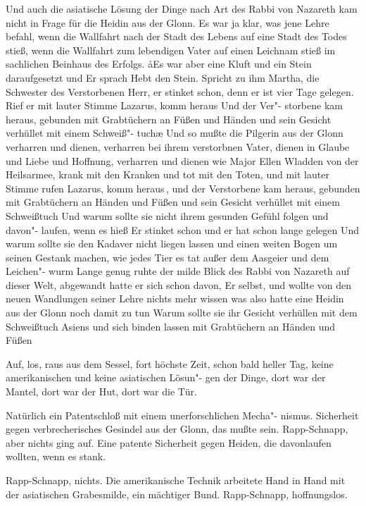 Und auch die asiatische Lösung der Dinge nach Art des Rabbi
von Nazareth kam nicht in Frage für die Heidin aus der Glonn.
Es war ja klar, was jene Lehre befahl, wenn die Wallfahrt nach
der Stadt des Lebens auf eine Stadt des Todes stieß, wenn
die Wallfahrt zum lebendigen Vater auf einen Leichnam stieß
im sachlichen Beinhaus des Erfolgs. \aa{}Es war aber eine Kluft
und ein Stein daraufgesetzt und Er sprach\dopp{} Hebt den Stein.
Spricht zu ihm Martha, die Schwester des Verstorbenen\dopp{}
Herr, er stinket schon, denn er ist vier Tage gelegen. Rief er
mit lauter Stimme\dopp{} Lazarus, komm heraus\ausr{} Und der Ver"-%
storbene kam heraus, gebunden mit Grabtüchern an Füßen
und Händen und sein Gesicht verhüllet mit einem Schweiß"-%
tuch\ausr{}\ae{} Und so mußte die Pilgerin aus der Glonn verharren
und dienen, verharren bei ihrem verstorbnen Vater, dienen
in Glaube und Liebe und Hoffnung, verharren und dienen
wie Major Ellen Wladden von der Heilsarmee, krank mit den
Kranken und tot mit den Toten, und mit lauter Stimme rufen\dopp{}
Lazarus, komm heraus\ausr{}\,, und der Verstorbene kam heraus,
gebunden mit Grabtüchern an Händen und Füßen und sein
Gesicht verhüllet mit einem Schweißtuch\punkte{} Und warum
sollte sie nicht ihrem gesunden Gefühl folgen und davon"-%
laufen, wenn es hieß\dopp{} Er stinket schon und er hat schon lange
gelegen\frag{} Und warum sollte sie den Kadaver nicht liegen
lassen und einen weiten Bogen um seinen Gestank machen,
wie jedes Tier es tat außer dem Aasgeier und dem Leichen"-%
wurm\frag{} Lange genug ruhte der milde Blick des Rabbi von
Nazareth auf dieser Welt, abgewandt hatte er sich schon
davon, Er selbst, und wollte von den neuen Wandlungen
seiner Lehre nichts mehr wissen\dopp{} was also hatte eine
Heidin aus der Glonn noch damit zu tun\frag{} Warum sollte
sie ihr Gesicht verhüllen mit dem Schweißtuch Asiens
und sich binden lassen mit Grabtüchern an Händen und
Füßen\frag{}

Auf, los, raus aus dem Sessel, fort höchste Zeit, schon bald
heller Tag, keine amerikanischen und keine asiatischen Lösun"-%
gen der Dinge, dort war der Mantel, dort war der Hut,
dort war die Tür.

Natürlich ein Patentschloß mit einem unerforschlichen Mecha"-%
nismus. Sicherheit gegen verbrecherisches Gesindel aus der
Glonn, das mußte sein. Rapp-Schnapp, aber nichts ging auf.
Eine patente Sicherheit gegen Heiden, die davonlaufen
wollten, wenn es stank.

Rapp-Schnapp, nichts. Die amerikanische Technik arbeitete
Hand in Hand mit der asiatischen Grabesmilde, ein mächtiger
Bund. Rapp-Schnapp, hoffnungslos.

